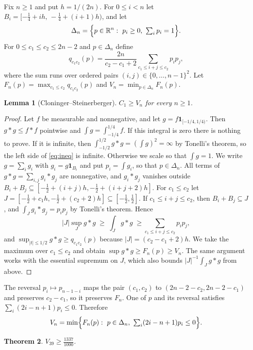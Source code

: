 \documentclass[11pt]{amsart}
\newtheorem{theorem}{Theorem}[section]
\newtheorem{lemma}[theorem]{Lemma}
\theoremstyle{definition}
\theoremstyle{remark}
\numberwithin{equation}{section}
\newcommand{\R}{\mathbb{R}}
\newcommand{\one}{\mathbf{1}}
\newcommand{\LAM}{\tfrac{1337}{1000}}
\newcommand{\Nbins}{39}
\begin{document}
Fix $n\ge1$ and put $h=1/(2n)$. For $0\le i<n$ let $B_i=[-\tfrac14+ih,\,-\tfrac14+(i+1)h)$, and let
\[
\Delta_n=\Bigl\{p\in\R^n:\ p_i\ge0,\ \textstyle\sum_i p_i=1\Bigr\}.
\]
For $0\le c_1\le c_2\le 2n-2$ and $p\in\Delta_n$ define
\begin{equation}\label{eq:q}
q_{c_1c_2}(p)=\frac{2n}{c_2-c_1+2}\sum_{c_1\le i+j\le c_2}p_ip_j,
\end{equation}
where the sum runs over ordered pairs $(i,j)\in\{0,\dots,n-1\}^2$. Let $F_n(p)=\max_{c_1\le c_2}q_{c_1c_2}(p)$ and $V_n=\min_{p\in\Delta_n}F_n(p)$.

\begin{lemma}[Cloninger--Steinerberger]\label{lem:window}
$C_1\ge V_n$ for every $n\ge1$.
\end{lemma}

\begin{proof}
Let $f$ be measurable and nonnegative, and let $g=f\one_{[-1/4,1/4)}$. Then $g*g\le f*f$ pointwise and $\int g=\int_{-1/4}^{1/4}f$. If this integral is zero there is nothing to prove. If it is infinite, then $\int_{-1/2}^{1/2}g*g=(\int g)^2=\infty$ by Tonelli's theorem, so the left side of \eqref{eq:ineq} is infinite. Otherwise we scale so that $\int g=1$. We write $g=\sum_ig_i$ with $g_i=g\one_{B_i}$ and put $p_i=\int g_i$, so that $p\in\Delta_n$. All terms of $g*g=\sum_{i,j}g_i*g_j$ are nonnegative, and $g_i*g_j$ vanishes outside $B_i+B_j\subseteq[-\tfrac12+(i+j)h,-\tfrac12+(i+j+2)h]$. For $c_1\le c_2$ let $J=[-\tfrac12+c_1h,-\tfrac12+(c_2+2)h]\subseteq[-\tfrac12,\tfrac12]$. If $c_1\le i+j\le c_2$, then $B_i+B_j\subseteq J$, and $\int_Jg_i*g_j=p_ip_j$ by Tonelli's theorem. Hence
\[
|J|\sup_J g*g\;\ge\;\int_Jg*g\;\ge\sum_{c_1\le i+j\le c_2}p_ip_j,
\]
and $\sup_{|t|\le1/2}g*g\ge q_{c_1c_2}(p)$ because $|J|=(c_2-c_1+2)h$. We take the maximum over $c_1\le c_2$ and obtain $\sup g*g\ge F_n(p)\ge V_n$. The same argument works with the essential supremum on $J$, which also bounds $|J|^{-1}\int_Jg*g$ from above.
\end{proof}

The reversal $p_i\mapsto p_{n-1-i}$ maps the pair $(c_1,c_2)$ to $(2n-2-c_2,2n-2-c_1)$ and preserves $c_2-c_1$, so it preserves $F_n$. One of $p$ and its reversal satisfies $\sum_i(2i-n+1)p_i\le0$. Therefore
\begin{equation}\label{eq:half}
V_n=\min\Bigl\{F_n(p):\ p\in\Delta_n,\ \textstyle\sum_i(2i-n+1)p_i\le0\Bigr\}.
\end{equation}

\begin{theorem}\label{thm:Vn}
$V_{\Nbins}\ge\LAM$.
\end{theorem}
\end{document}
